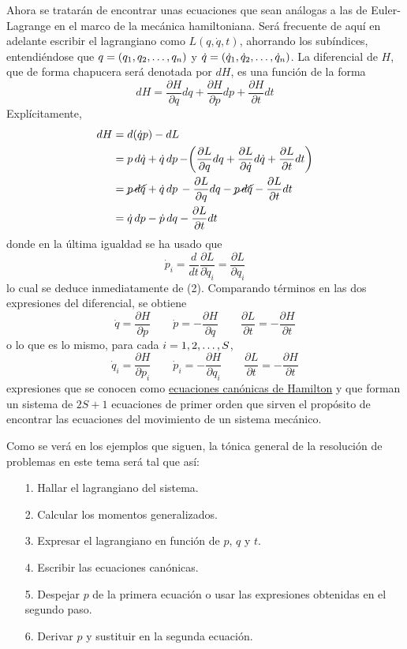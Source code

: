 \documentclass[12pt]{report}
\begin{document}
\vspace{2mm}
Ahora se tratarán de encontrar unas ecuaciones que sean análogas a las de Euler-Lagrange en el marco de la mecánica hamiltoniana. Será frecuente de aquí en adelante escribir el lagrangiano como $L(q,\dot{q},t)$, ahorrando los subíndices, entendiéndose que $q = (q_1,q_2,\mathellipsis,q_n)$ y $\dot{q} = (\dot{q}_1,\dot{q}_2,\mathellipsis,\dot{q}_n)$. La diferencial de $H$, que de forma chapucera será denotada por $dH$, es una función de la forma
\[dH = \frac{\partial H}{\partial q}dq +\frac{\partial H}{\partial p} dp+\frac{\partial H}{\partial t}dt\]
Explícitamente,
\[
\begin{aligned}[t]
    dH &= d(\dot{q}p) - dL \\
    &= p \, d\dot{q} + \dot{q} \, dp \, - \biggr(\frac{\partial L}{\partial q} dq + \frac{\partial L}{\partial \dot{q}} d\dot{q} + \frac{\partial L}{\partial t} dt \biggl) \\ 
    &= \cancel{p \, d\dot{q}} + \dot{q} \, dp \, - \frac{\partial L}{\partial q} dq  - \cancel{p \, d\dot{q}} - \frac{\partial L}{\partial t}dt \\
    &= \dot{q} \, dp -\dot{p} \, dq - \frac{\partial L}{\partial t} dt
\end{aligned}
\]
donde en la última igualdad se ha usado que
\[\dot{p}_i = \frac{d}{dt}\frac{\partial L}{\partial \dot{q}_i} = \frac{\partial L}{\partial q_i}\]
lo cual se deduce inmediatamente de (2). Comparando términos en las dos expresiones del diferencial, se obtiene
\[\dot{q} = \frac{\partial H}{\partial p} \qquad \dot{p} = -\frac{\partial H}{\partial q} \qquad \frac{\partial L}{\partial t} = -\frac{\partial H}{\partial t}\]
o lo que es lo mismo, para cada $i = 1,2,\mathellipsis,S$,
\[\boxed{\dot{q}_i = \frac{\partial H}{\partial p_i}} \qquad \boxed{\dot{p}_i = -\frac{\partial H}{\partial q_i}} \qquad \boxed{\frac{\partial L}{\partial t} = -\frac{\partial H}{\partial t}}\]
expresiones que se conocen como \ul{ecuaciones canónicas de Hamilton} y que forman un sistema de $2S+1$ ecuaciones de primer orden que sirven el propósito de encontrar las ecuaciones del movimiento de un sistema mecánico.

\vspace{2mm}
Como se verá en los ejemplos que siguen, la tónica general de la resolución de problemas en este tema será tal que así:
\begin{itemize}
    \item[1.] Hallar el lagrangiano del sistema.
    \item[2.] Calcular los momentos generalizados.
    \item[3.] Expresar el lagrangiano en función de $p$, $q$ y $t$.
    \item[4.] Escribir las ecuaciones canónicas.
    \item[5.] Despejar $p$ de la primera ecuación o usar las expresiones obtenidas en el segundo paso.
    \item[6.] Derivar $p$ y sustituir en la segunda ecuación.
\end{itemize}
\end{document}
